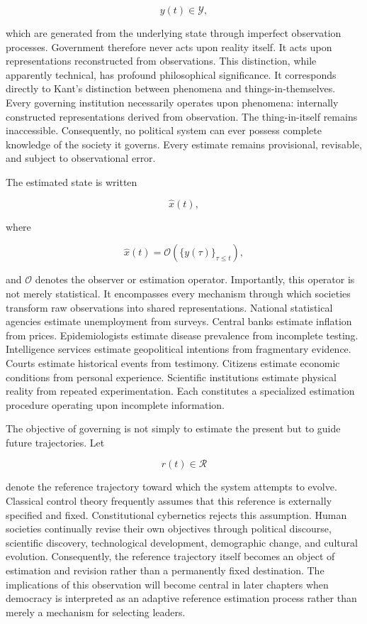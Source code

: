\documentclass[12pt,a4paper]{article}
\begin{document}
\[
y(t)\in\mathcal{Y},
\]

which are generated from the underlying state through imperfect observation processes. Government therefore never acts upon reality itself. It acts upon representations reconstructed from observations. This distinction, while apparently technical, has profound philosophical significance. It corresponds directly to Kant's distinction between phenomena and things-in-themselves. Every governing institution necessarily operates upon phenomena: internally constructed representations derived from observation. The thing-in-itself remains inaccessible. Consequently, no political system can ever possess complete knowledge of the society it governs. Every estimate remains provisional, revisable, and subject to observational error.

The estimated state is written

\[
\hat{x}(t),
\]

where

\[
\hat{x}(t)
=
\mathcal{O}
\left(
\{y(\tau)\}_{\tau\le t}
\right),
\]

and \(\mathcal{O}\) denotes the observer or estimation operator. Importantly, this operator is not merely statistical. It encompasses every mechanism through which societies transform raw observations into shared representations. National statistical agencies estimate unemployment from surveys. Central banks estimate inflation from prices. Epidemiologists estimate disease prevalence from incomplete testing. Intelligence services estimate geopolitical intentions from fragmentary evidence. Courts estimate historical events from testimony. Citizens estimate economic conditions from personal experience. Scientific institutions estimate physical reality from repeated experimentation. Each constitutes a specialized estimation procedure operating upon incomplete information.

The objective of governing is not simply to estimate the present but to guide future trajectories. Let

\[
r(t)\in\mathcal{R}
\]

denote the reference trajectory toward which the system attempts to evolve. Classical control theory frequently assumes that this reference is externally specified and fixed. Constitutional cybernetics rejects this assumption. Human societies continually revise their own objectives through political discourse, scientific discovery, technological development, demographic change, and cultural evolution. Consequently, the reference trajectory itself becomes an object of estimation and revision rather than a permanently fixed destination. The implications of this observation will become central in later chapters when democracy is interpreted as an adaptive reference estimation process rather than merely a mechanism for selecting leaders.
\end{document}
